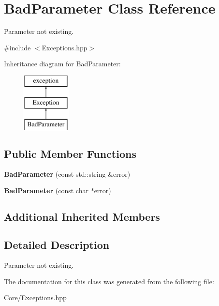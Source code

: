 \hypertarget{class_bad_parameter}{\section{Bad\-Parameter Class Reference}
\label{class_bad_parameter}
}


Parameter not existing.  




{\ttfamily \#include $<$Exceptions.\-hpp$>$}

Inheritance diagram for Bad\-Parameter\-:\begin{figure}[H]
\begin{center}
\leavevmode
\includegraphics[height=3.000000cm]{class_bad_parameter}
\end{center}
\end{figure}
\subsection*{Public Member Functions}
\begin{DoxyCompactItemize}
\item 
\hypertarget{class_bad_parameter_ae87d4d3bf6936a524a45b97602f369dd}{{\bfseries Bad\-Parameter} (const std\-::string \&error)}\label{class_bad_parameter_ae87d4d3bf6936a524a45b97602f369dd}

\item 
\hypertarget{class_bad_parameter_a0c4e8cab27c070ab04c716001d8083f7}{{\bfseries Bad\-Parameter} (const char $\ast$error)}\label{class_bad_parameter_a0c4e8cab27c070ab04c716001d8083f7}

\end{DoxyCompactItemize}
\subsection*{Additional Inherited Members}


\subsection{Detailed Description}
Parameter not existing. 

The documentation for this class was generated from the following file\-:\begin{DoxyCompactItemize}
\item 
Core/Exceptions.\-hpp\end{DoxyCompactItemize}
